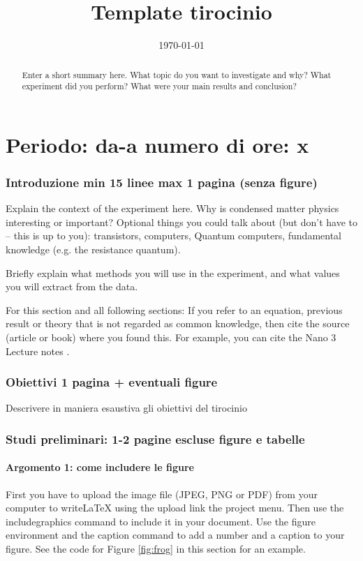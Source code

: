 \documentclass{article}
\title{Template tirocinio}
\author{\tirocinante}
\date{\today}
\begin{document}
\maketitle
\thispagestyle{fancy}
%

\part{Periodo: da-a numero di ore: x}
\begin{abstract}
Enter a short summary here. What topic do you want to investigate and why? What experiment did you perform? What were your main results and conclusion?
\end{abstract}

\section{Introduzione min 15 linee max 1 pagina (senza figure)}
\label{sec:introduction}

Explain the context of the experiment here. Why is condensed matter physics interesting or important?
Optional things you could talk about (but don't have to -- this is up to you): transistors, computers, Quantum computers, fundamental knowledge (e.g. the resistance quantum).

Briefly explain what methods you will use in the experiment, and what values you will extract from the data.

For this section and all following sections: If you refer to an equation, previous result or theory that is not regarded as common knowledge, then cite the source (article or book) where you found this. For example, you can cite the Nano 3 Lecture notes \cite{nano3}.

\section{Obiettivi 1 pagina + eventuali figure}
\label{sec:obiettivi}

Descrivere in maniera esaustiva gli obiettivi del tirocinio

\section{Studi preliminari: 1-2 pagine escluse figure e tabelle}
\label{sec:theory}

\subsection{Argomento 1: come includere le figure}
First you have to upload the image file (JPEG, PNG or PDF) from your computer to writeLaTeX using the upload link the project menu. Then use the includegraphics command to include it in your document. Use the figure environment and the caption command to add a number and a caption to your figure. See the code for Figure \ref{fig:frog} in this section for an example.
\end{document}
